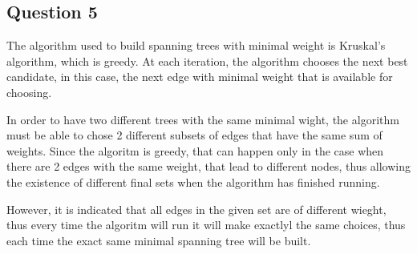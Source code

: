 \documentclass{article}
\begin{document}
\subsection*{Question 5}
\indent The algorithm used to build spanning trees with minimal weight is
Kruskal's algorithm, which is greedy. At each iteration, the algorithm chooses
the next best candidate, in this case, the next edge with minimal weight that is
available for choosing.
 
\indent In order to have two different trees with the same minimal wight, the
algorithm must be able to chose 2 different subsets of edges that have the same sum
of weights. Since the algoritm is greedy, that can happen only in the case when
there are 2 edges with the same weight, that lead to different nodes, thus
allowing the existence of different final sets when the algorithm has finished
running. 

\indent However, it is indicated that all edges in the given set are of
different wieght, thus every time the algoritm will run it will make exactlyl
the same choices, thus each time the exact same minimal spanning tree will be
built.
\end{document}
